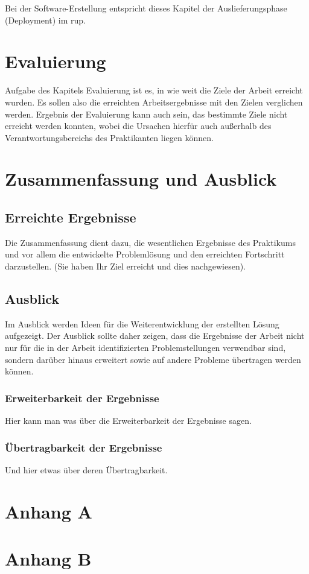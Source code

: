 \documentclass[oneside]{ausarbeitung}
\begin{document}
Bei der Software-Erstellung entspricht dieses Kapitel der 
Auslieferungsphase (Deployment) im \ac{rup}.

\chapter{Evaluierung}

Aufgabe des Kapitels Evaluierung ist es, in wie weit die Ziele der 
Arbeit erreicht wurden. Es sollen also die erreichten Arbeitsergebnisse 
mit den Zielen verglichen werden. Ergebnis der Evaluierung kann auch 
sein, das bestimmte Ziele nicht erreicht werden konnten, wobei die 
Ursachen hierfür auch außerhalb des Verantwortungsbereichs des 
Praktikanten liegen können.

\chapter{Zusammenfassung und Ausblick}
\label{cha:zusammenfassung}

\section{Erreichte Ergebnisse}
\label{sec:ergebnisse}

Die Zusammenfassung dient dazu, die wesentlichen Ergebnisse des 
Praktikums und vor allem die entwickelte Problemlösung und den 
erreichten Fortschritt darzustellen. (Sie haben Ihr Ziel erreicht und 
dies nachgewiesen).

\section{Ausblick}
\label{sec:ausblick}

Im Ausblick werden Ideen für die Weiterentwicklung der erstellten Lösung 
aufgezeigt. Der Ausblick sollte daher zeigen, dass die Ergebnisse der 
Arbeit nicht nur für die in der Arbeit identifizierten Problemstellungen 
verwendbar sind, sondern darüber hinaus erweitert sowie auf andere 
Probleme übertragen werden können.

\subsection{Erweiterbarkeit der Ergebnisse}
\label{sub:erweiterbarkeit}

Hier kann man was über die Erweiterbarkeit der Ergebnisse sagen.

\subsection{Übertragbarkeit der Ergebnisse}
\label{sub:uebertragbarkeit}

Und hier etwas über deren Übertragbarkeit.

\appendix

\printbibliography[heading=bibintoc]

\chapter{Anhang A}

\chapter{Anhang B}
\end{document}

